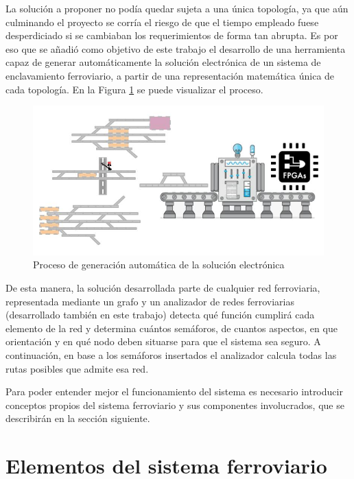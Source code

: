 		La solución a proponer no podía quedar sujeta a una única topología, ya que aún culminando el proyecto se corría el riesgo de que el tiempo empleado fuese desperdiciado si se cambiaban los requerimientos de forma tan abrupta. Es por eso que se añadió como objetivo de este trabajo el desarrollo de una herramienta capaz de generar automáticamente la solución electrónica de un sistema de enclavamiento ferroviario, a partir de una representación matemática única de cada topología. En la Figura \ref{fig:Generacion} se puede visualizar el proceso.
		
		\begin{figure}[htbp!]
			\centering
			\includegraphics[scale=.5]{./Figures/Generacion}
			\caption{Proceso de generación automática de la solución electrónica}
			\label{fig:Generacion}
		\end{figure}
		
		De esta manera, la solución desarrollada parte de cualquier red ferroviaria, representada mediante un grafo y un analizador de redes ferroviarias (desarrollado también en este trabajo) detecta qué función cumplirá cada elemento de la red y determina cuántos semáforos, de cuantos aspectos, en que orientación y en qué nodo deben situarse para que el sistema sea seguro. A continuación, en base a los semáforos insertados el analizador calcula todas las rutas posibles que admite esa red.
	
		Para poder entender mejor el funcionamiento del sistema es necesario introducir conceptos propios del sistema ferroviario y sus componentes involucrados, que se describirán en la sección siguiente.

	\section{Elementos del sistema ferroviario}
	
